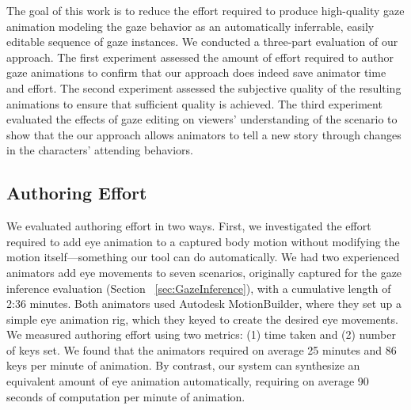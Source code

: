 The goal of this work is to reduce the effort required to produce high-quality gaze animation modeling the gaze behavior as an automatically inferrable, easily editable sequence of gaze instances. %
We conducted a three-part evaluation of our approach. The first experiment assessed the amount of effort required to author gaze animations to confirm that our approach does indeed save animator time and effort. The second experiment assessed the subjective quality of the resulting animations to ensure that sufficient quality is achieved. The third experiment evaluated the effects of gaze editing on viewers' understanding of the scenario to show that the our approach allows animators to tell a new story through changes in the characters' attending behaviors.

\subsection{Authoring Effort}
\label{sec:GazeAuthoringEffortEvaluation}

We evaluated authoring effort in two ways. First, we investigated the effort required to add eye animation to a captured body motion without modifying the motion itself---something our tool can do automatically. We had two experienced animators add eye movements to seven scenarios, originally captured for the gaze inference evaluation (Section ~\ref{sec:GazeInference}), with a cumulative length of 2:36 minutes. Both animators used Autodesk MotionBuilder, where they set up a simple eye animation rig, which they keyed to create the desired eye movements. We measured authoring effort using two metrics: (1) time taken and (2) number of keys set. We found that the animators required on average 25 minutes and 86 keys per minute of animation. By contrast, our system can synthesize an equivalent amount of eye animation automatically, requiring on average 90 seconds of computation per minute of animation.

